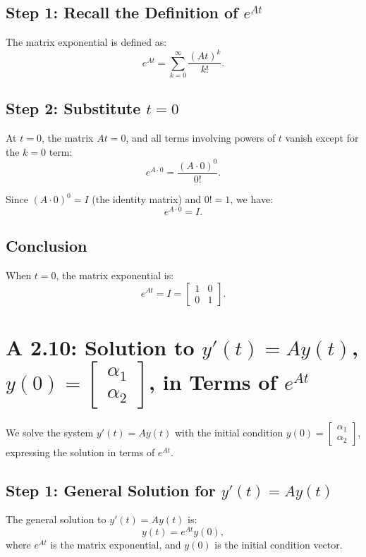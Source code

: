 \documentclass[12pt]{article}
\begin{document}
\subsection*{Step 1: Recall the Definition of \(e^{At}\)}

The matrix exponential is defined as:
\[
e^{At} = \sum_{k=0}^\infty \frac{(At)^k}{k!}.
\]

\subsection*{Step 2: Substitute \(t = 0\)}

At \(t = 0\), the matrix \(At = 0\), and all terms involving powers of \(t\) vanish except for the \(k = 0\) term:
\[
e^{A \cdot 0} = \frac{(A \cdot 0)^0}{0!}.
\]

Since \((A \cdot 0)^0 = I\) (the identity matrix) and \(0! = 1\), we have:
\[
e^{A \cdot 0} = I.
\]

\subsection*{Conclusion}

When \(t = 0\), the matrix exponential is:
\[
e^{At} = I = \begin{bmatrix} 1 & 0 \\ 0 & 1 \end{bmatrix}.
\]

\section*{A 2.10: Solution to \(y'(t) = Ay(t)\), \(y(0) = \begin{bmatrix} \alpha_1 \\ \alpha_2 \end{bmatrix}\), in Terms of \(e^{At}\)}

We solve the system \(y'(t) = Ay(t)\) with the initial condition \(y(0) = \begin{bmatrix} \alpha_1 \\ \alpha_2 \end{bmatrix}\), expressing the solution in terms of \(e^{At}\).

\subsection*{Step 1: General Solution for \(y'(t) = Ay(t)\)}

The general solution to \(y'(t) = Ay(t)\) is:
\[
y(t) = e^{At} y(0),
\]
where \(e^{At}\) is the matrix exponential, and \(y(0)\) is the initial condition vector.
\end{document}
